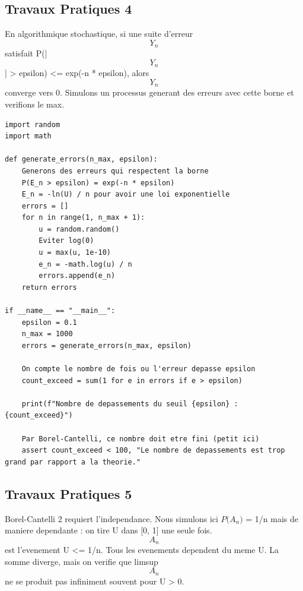 \documentclass[11pt,a4paper]{article}
\begin{document}
\subsection*{Travaux Pratiques 4}
En algorithmique stochastique, si une suite d'erreur $$Y_n$$ satisfait P(|$$Y_n$$| > epsilon) <= exp(-n * epsilon),
alors $$Y_n$$ converge vers 0. Simulons un processus generant des erreurs avec cette borne et verifions le max.

\begin{lstlisting}
import random
import math

def generate_errors(n_max, epsilon):
    Generons des erreurs qui respectent la borne
    P(E_n > epsilon) = exp(-n * epsilon)
    E_n = -ln(U) / n pour avoir une loi exponentielle
    errors = []
    for n in range(1, n_max + 1):
        u = random.random()
        Eviter log(0)
        u = max(u, 1e-10)
        e_n = -math.log(u) / n
        errors.append(e_n)
    return errors

if __name__ == "__main__":
    epsilon = 0.1
    n_max = 1000
    errors = generate_errors(n_max, epsilon)

    On compte le nombre de fois ou l'erreur depasse epsilon
    count_exceed = sum(1 for e in errors if e > epsilon)

    print(f"Nombre de depassements du seuil {epsilon} : {count_exceed}")

    Par Borel-Cantelli, ce nombre doit etre fini (petit ici)
    assert count_exceed < 100, "Le nombre de depassements est trop grand par rapport a la theorie."
\end{lstlisting}


\subsection*{Travaux Pratiques 5}
Borel-Cantelli 2 requiert l'independance.
Nous simulons ici $P($$A_n$$)$ = 1/n mais de maniere dependante : on tire U dans [0, 1] une seule fois.
$$A_n$$ est l'evenement {U <= 1/n}. Tous les evenements dependent du meme U.
La somme diverge, mais on verifie que limsup $$A_n$$ ne se produit pas infiniment souvent pour U > 0.
\end{document}
